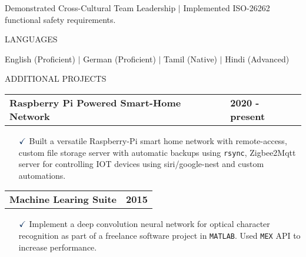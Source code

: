 \documentclass[a4paper,10pt]{article}
\begin{document}
\vspace{-0.1cm}
\noindent{\rule{\linewidth}{0.01cm}}

\noindent Demonstrated Cross-Cultural Team Leadership $\vert$ Implemented ISO-26262 functional safety requirements.

\noindent{\rule{\linewidth}{1.4pt}}
LANGUAGES

\vspace{-0.1cm}
\noindent{\rule{\linewidth}{0.01cm}}

\noindent English (Proficient) {$\vert$} German (Proficient) $\vert$ Tamil (Native) $\vert$ Hindi (Advanced)

\noindent{\rule{\linewidth}{1.4pt}}
ADDITIONAL PROJECTS

\vspace{-0.1cm}
\noindent{\rule{\linewidth}{0.01cm}}

\vspace{0.3cm}
\noindent
\begin{tabular}{ @{\hskip 0pt}m{} >{\raggedleft\arraybackslash}p{} }
    \noindent\textbf{Raspberry Pi Powered Smart-Home Network} & \textbf{2020 - present}
\end{tabular}

{\small
\begin{itemize}
    \item[$\textcolor{highlightcolor}{\checkmark}$]  
            Built a versatile Raspberry-Pi smart home network with
            remote-access, custom file storage server with automatic backups
            using {\verb|rsync|}, Zigbee2Mqtt server for controlling IOT devices using
            siri/google-nest and custom automations.
\end{itemize}
}

\vspace{0.3cm}
\noindent
\begin{tabular}{ @{\hskip 0pt}m{} >{\raggedleft\arraybackslash}p{} }
    \noindent\textbf{Machine Learing Suite} & \textbf{2015}
\end{tabular}

{\small
\begin{itemize}
    \item[$\textcolor{highlightcolor}{\checkmark}$]  
        Implement a deep convolution neural network for optical character recognition as part of a freelance software project in {\verb|MATLAB|}. Used {\verb|MEX|} API to increase performance. 
\end{itemize}
}
\end{document}
